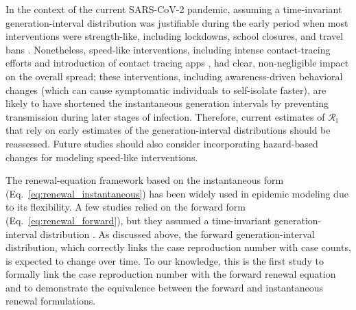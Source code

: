 \documentclass[12pt]{article}
\newcommand{\comment}{}
\renewcommand{\comment}{\nocomment}
\renewcommand{\comment}{\showcomment}
\newcommand{\showcomment}[3]{\textcolor{#1}{\textbf{[#2: }\textsl{#3}\textbf{]}}}
\newcommand{\nocomment}[3]{}
\newcommand{\swp}[1]{\comment{magenta}{SWP}{#1}}
\newcommand{\eref}[1]{Eq.~\ref{eq:#1}}
\newcommand{\Rx}[1]{\ensuremath{{\mathcal R}_{#1}}\xspace}
\newcommand{\Ri}{\Rx{\mathrm{i}}}
\newcommand{\RR}{\ensuremath{{\mathcal R}}\xspace}
\begin{document}
In the context of the current SARS-CoV-2 pandemic, assuming a time-invariant generation-interval distribution was justifiable during the early period when most interventions were strength-like, including lockdowns, school closures, and travel bans \citep{flaxman2020estimating,li2021temporal,brauner2021inferring}.
Nonetheless, speed-like  interventions, including intense contact-tracing efforts \citep{park2020contact} and introduction of contact tracing apps \citep{wymant2021introduction}, had clear, non-negligible impact on the overall spread;
these interventions, including awareness-driven behavioral changes (which can cause symptomatic individuals to self-isolate faster), are likely to have shortened the instantaneous generation intervals by preventing transmission during later stages of infection.
Therefore, current estimates of $\Ri$ that rely on early estimates of the generation-interval distributions should be reassessed.
Future studies should also consider incorporating hazard-based changes for modeling speed-like interventions.


The renewal-equation framework based on the instantaneous form (\eref{renewal_instantaneous}) has been widely used in epidemic modeling due to its flexibility.
A few studies relied on the forward form (\eref{renewal_forward}), but they assumed a time-invariant generation-interval distribution \citep{nishiura2007time,alvarez2020variational,white2021statistical}.
As discussed above, the forward generation-interval distribution, which correctly links the case reproduction number with case counts, is expected to change over time.
To our knowledge, this is the first study to formally link the case reproduction number with the forward renewal equation and to demonstrate the equivalence between the forward and instantaneous renewal formulations.
\end{document}
